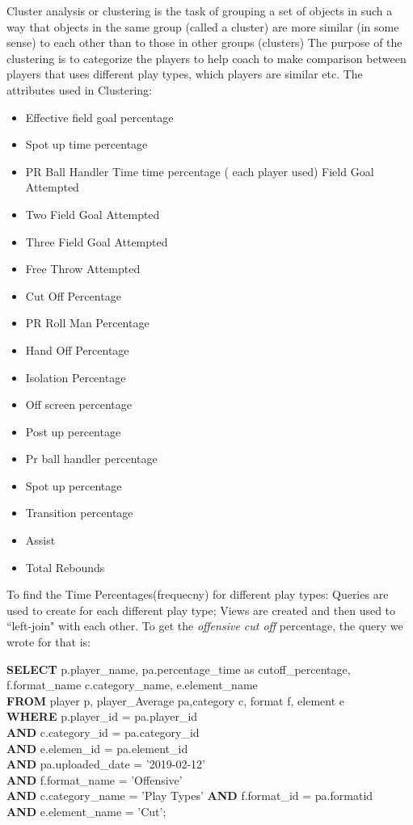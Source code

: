 \documentclass[conference]{IEEEtran}
\begin{document}
Cluster analysis or clustering is the task of grouping a set of objects in such a way that objects in the same group (called a cluster) are more similar (in some sense) to each other than to those in other groups (clusters) 
The purpose of the clustering is to categorize the players to help coach to make comparison between players that uses different play types, which players are similar etc. 
The attributes used in Clustering:
\begin{itemize}
\item Effective field goal percentage
\item Spot up time percentage
\item PR Ball Handler Time time percentage ( each player used) Field Goal Attempted
\item Two Field Goal Attempted
\item Three Field Goal Attempted
\item Free Throw Attempted
\item Cut Off Percentage
\item PR Roll Man Percentage
\item Hand Off Percentage
\item Isolation Percentage
\item Off screen percentage
\item Post up percentage
\item Pr ball handler percentage
\item Spot up percentage
\item Transition percentage
\item Assist
\item Total Rebounds 
\end{itemize} 

To find the Time Percentages(frequecny) for different play types: Queries are used to create for each different play type; Views are created and then used to ``left-join" with each other.
To get the \textit{offensive cut off} percentage, the query we wrote for that is:\\
\begin{flushleft}
{\bf SELECT} p.player\_name, pa.percentage\_time as cutoff\_percentage, f.format\_name
c.category\_name, e.element\_name\\
{\bf FROM} player p, player\_Average pa,category c, format f, element e\\
{\bf WHERE} p.player\_id = pa.player\_id\\
{\bf AND} c.category\_id = pa.category\_id\\
{\bf AND} e.elemen\_id = pa.element\_id\\
{\bf AND} pa.uploaded\_date = '2019-02-12'\\
{\bf AND} f.format\_name = 'Offensive'\\
{\bf AND} c.category\_name = 'Play Types' {\bf AND} f.format\_id = pa.formatid\\ 
{\bf AND} e.element\_name = 'Cut';

\end{flushleft}
\end{document}
